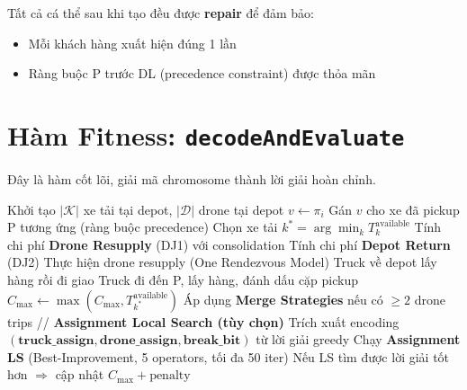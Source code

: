 \documentclass[12pt,a4paper]{article}
\begin{document}
Tất cả cá thể sau khi tạo đều được \textbf{repair} để đảm bảo:
\begin{itemize}[nosep]
    \item Mỗi khách hàng xuất hiện đúng 1 lần
    \item Ràng buộc P trước DL (precedence constraint) được thỏa mãn
\end{itemize}

\section{Hàm Fitness: \texttt{decodeAndEvaluate}}

Đây là hàm cốt lõi, giải mã chromosome thành lời giải hoàn chỉnh.

\begin{algorithm}[h!]
\caption{decodeAndEvaluate($\pi$, data)}
\begin{algorithmic}[1]
\STATE Khởi tạo $|\mathcal{K}|$ xe tải tại depot, $|\mathcal{D}|$ drone tại depot
    \STATE $v \leftarrow \pi_i$ 
        \STATE Gán $v$ cho xe đã pickup P tương ứng (ràng buộc precedence)
    \ELSE
        \STATE Chọn xe tải $k^* = \arg\min_{k} T_k^{\text{available}}$ 
            \STATE Tính chi phí \textbf{Drone Resupply} (DJ1) với consolidation
            \STATE Tính chi phí \textbf{Depot Return} (DJ2)
                \STATE Thực hiện drone resupply (One Rendezvous Model)
            \ELSE
                \STATE Truck về depot lấy hàng rồi đi giao
            \ENDIF
            \STATE Truck đi đến P, lấy hàng, đánh dấu cặp pickup
        \ENDIF
    \ENDIF
    \STATE $C_{\max} \leftarrow \max(C_{\max}, T_{k^*}^{\text{available}})$
\ENDFOR
\STATE Áp dụng \textbf{Merge Strategies} nếu có $\geq 2$ drone trips
\STATE
\STATE // \textbf{Assignment Local Search (tùy chọn)}
\STATE Trích xuất encoding $(\mathbf{truck\_assign}, \mathbf{drone\_assign}, \mathbf{break\_bit})$ từ lời giải greedy
\STATE Chạy \textbf{Assignment LS} (Best-Improvement, 5 operators, tối đa 50 iter)
\STATE Nếu LS tìm được lời giải tốt hơn $\Rightarrow$ cập nhật
\STATE
\STATE \RETURN $C_{\max} + \text{penalty}$
\end{algorithmic}
\end{algorithm}
\end{document}
